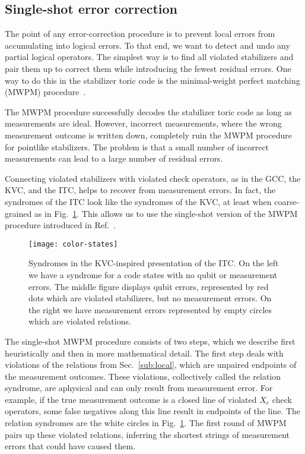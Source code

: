 \subsection{Single-shot error correction} \label{sub:single-shot}

The point of any error-correction procedure is to prevent local errors from accumulating into logical errors. To that end, we want to detect and undo any partial logical operators. The simplest way is to find all violated stabilizers and pair them up to correct them while introducing the fewest residual errors. One way to do this in the stabilizer toric code is the minimal-weight perfect matching (MWPM) procedure~\cite{Dennis2002Topological}. 

The MWPM procedure successfully decodes the stabilizer toric code as long as measurements are ideal. However, incorrect measurements, where the wrong measurement outcome is written down, completely ruin the MWPM procedure for pointlike stabilizers. The problem is that a small number of incorrect measurements can lead to a large number of residual errors. 

Connecting violated stabilizers with violated check operators, as in the GCC, the KVC, and the ITC, helps to recover from measurement errors. In fact, the syndromes of the ITC look like the syndromes of the KVC, at least when coarse-grained as in Fig.~\ref{fig:color-states}. This allows us to use the single-shot version of the MWPM procedure introduced in Ref.~\cite{KubicaVasmer2022}. 

\begin{figure}
    \centering
    \texttt{[image: color-states]}
    \caption[Syndromes in the KVC-inspired presentation of the ITC]{Syndromes in the KVC-inspired presentation of the ITC. On the left we have a syndrome for a code states with no qubit or measurement errors. The middle figure displays qubit errors, represented by red dots which are violated stabilizers, but no measurement errors. On the right we have measurement errors represented by empty circles which are violated relations. }
    \label{fig:color-states}
\end{figure}

The single-shot MWPM procedure consists of two steps, which we describe first heuristically and then in more mathematical detail. The first step deals with violations of the relations from Sec.~\ref{sub:local}, which are unpaired endpoints of the measurement outcomes. These violations, collectively called the relation syndrome, are aphysical and can only result from measurement error. For example, if the true measurement outcome is a closed line of violated $X_e$ check operators, some false negatives along this line result in endpoints of the line. The relation syndromes are the white circles in Fig.~\ref{fig:color-states}. The first round of MWPM pairs up these violated relations, inferring the shortest strings of measurement errors that could have caused them. 

